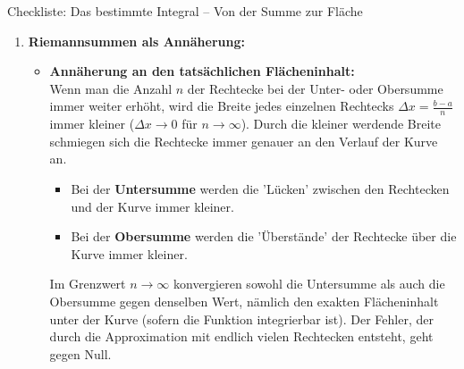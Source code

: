 \begin{loesungsumgebung}{Checkliste: Das bestimmte Integral – Von der Summe zur Fläche}

\begin{enumerate}[label=(\alph*)]
    \item \textbf{Riemannsummen als Annäherung:}
    \begin{itemize}
        \item \textbf{Annäherung an den tatsächlichen Flächeninhalt:} \\
        Wenn man die Anzahl $n$ der Rechtecke bei der Unter- oder Obersumme immer weiter erhöht, wird die Breite jedes einzelnen Rechtecks $\Delta x = \frac{b-a}{n}$ immer kleiner ($\Delta x \to 0$ für $n \to \infty$).
        Durch die kleiner werdende Breite schmiegen sich die Rechtecke immer genauer an den Verlauf der Kurve an.
        \begin{itemize}
            \item Bei der \textbf{Untersumme} werden die 'Lücken' zwischen den Rechtecken und der Kurve immer kleiner.
            \item Bei der \textbf{Obersumme} werden die 'Überstände' der Rechtecke über die Kurve immer kleiner.
        \end{itemize}
        Im Grenzwert $n \to \infty$ konvergieren sowohl die Untersumme als auch die Obersumme gegen denselben Wert, nämlich den exakten Flächeninhalt unter der Kurve (sofern die Funktion integrierbar ist). Der Fehler, der durch die Approximation mit endlich vielen Rechtecken entsteht, geht gegen Null.


\end{itemize}
\end{enumerate}
\end{loesungsumgebung}
